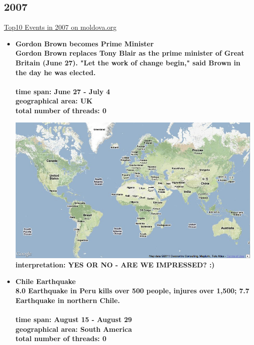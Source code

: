 \documentclass[11pt,a4paper,english]{article}
\begin{document}
			\subsection{2007}
			\href{http://social.moldova.org/news/10-most-important-world-events-of-2007-217388-eng.html}{Top10 Events in 2007 on moldova.org}
				\begin{itemize}
					\item \bf Gordon Brown becomes Prime Minister \rm
						\\ Gordon Brown replaces Tony Blair as the prime minister of Great Britain (June 27). "Let the work of change begin," said Brown in the day he was elected.
						\\\\ \bf time span: \rm June 27 - July 4
						\\ \bf geographical area: \rm UK
						\\ \bf total number of threads: \rm 0
					
						\includegraphics[width=130mm]{img/2005-1}
						\bf interpretation: \rm YES OR NO - ARE WE IMPRESSED? :)
						
						
						
					\item \bf Chile Earthquake \rm
						\\ 8.0 Earthquake in Peru kills over 500 people, injures over 1,500; 7.7 Earthquake in northern Chile.
						\\\\ \bf time span: \rm August 15 - August 29
						\\ \bf geographical area: \rm South America
						\\ \bf total number of threads: \rm 0
					

\end{itemize}
\end{document}
